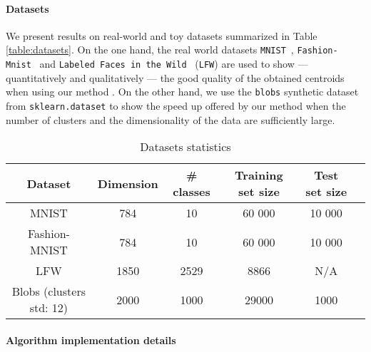 \paragraph{Datasets}
We present results on real-world and toy datasets summarized in Table \ref{table:datasets}. On the one hand, the real world datasets \texttt{MNIST}~\cite{lecun-mnisthandwrittendigit-2010}, \texttt{Fashion-Mnist}~\cite{Pedregosa2011Scikit} and \texttt{Labeled Faces in the Wild}~\cite{Huang07e.:labeled} (\texttt{LFW}) are used to show --- quantitatively and qualitatively --- the good quality of the obtained centroids when using our method \qkmeans. On the other hand, we use the \texttt{blobs} synthetic dataset from \texttt{sklearn.dataset} to show the speed up offered by our method \qkmeans when the number of clusters and the dimensionality of the data are sufficiently large.

\begin{table*}[!h]
\centering
\begin{tabular}{|c|c|c|c|c|c|}
\hline
\textbf{Dataset} & \textbf{Dimension}        & \textbf{\# classes} & \textbf{Training set size} & \textbf{Test set size} \\ \hline
MNIST                   & 784   & 10        & 60 000    & 10 000               \\ \hline
Fashion-MNIST           & 784   & 10        & 60 000    & 10 000               \\ \hline
LFW                     & 1850  & 2529      & 8866      & N/A               \\ \hline
Blobs (clusters std: 12)   & 2000  & 1000      & 29000      & 1000               \\ \hline
\end{tabular}
\caption{Datasets statistics}
\label{tab:data}
\end{table*}

\paragraph{Algorithm implementation details}

~\\


%

